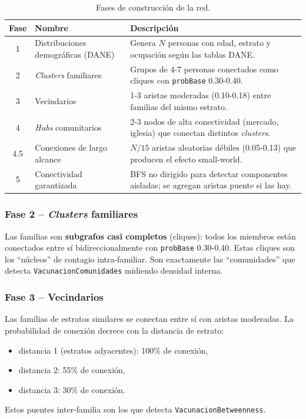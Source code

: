 \documentclass[spanish,notitlepage,letterpaper, 12pt]{article}
\begin{document}
\begin{table}[H]
\centering
\small
\caption{Fases de construcci\'on de la red.}
\label{tab:fases}
\begin{tabular}{c p{4cm} p{8cm}}
\toprule
\textbf{Fase} & \textbf{Nombre} & \textbf{Descripci\'on} \\
\midrule
1 & Distribuciones demogr\'aficas (DANE) & Genera $N$ personas con edad, estrato y ocupaci\'on seg\'un las tablas DANE. \\
2 & \textit{Clusters} familiares & Grupos de 4-7 personas conectados como cliques con \texttt{probBase} 0.30-0.40. \\
3 & Vecindarios & 1-3 aristas moderadas (0.10-0.18) entre familias del mismo estrato. \\
4 & \textit{Hubs} comunitarios & 2-3 nodos de alta conectividad (mercado, iglesia) que conectan distintos \textit{clusters}. \\
4.5 & Conexiones de largo alcance & $N/15$ aristas aleatorias d\'ebiles (0.05-0.13) que producen el efecto small-world. \\
5 & Conectividad garantizada & BFS no dirigido para detectar componentes aisladas; se agregan aristas puente si las hay. \\
\bottomrule
\end{tabular}
\end{table}

\subsubsection{Fase 2 -- \textit{Clusters} familiares}

Las familias son \textbf{subgrafos casi completos} (cliques): todos los miembros est\'an conectados entre s\'i bidireccionalmente con \texttt{probBase} 0.30-0.40. Estas cliques son los ``n\'ucleos'' de contagio intra-familiar. Son exactamente las ``comunidades'' que detecta \texttt{VacunacionComunidades} midiendo densidad interna.

\subsubsection{Fase 3 -- Vecindarios}

Las familias de estratos similares se conectan entre s\'i con aristas moderadas. La probabilidad de conexi\'on decrece con la distancia de estrato:
\begin{itemize}
    \item distancia 1 (estratos adyacentes): 100\% de conexi\'on,
    \item distancia 2: 55\% de conexi\'on,
    \item distancia 3: 30\% de conexi\'on.
\end{itemize}
Estos puentes inter-familia son los que detecta \texttt{VacunacionBetweenness}.
\end{document}
